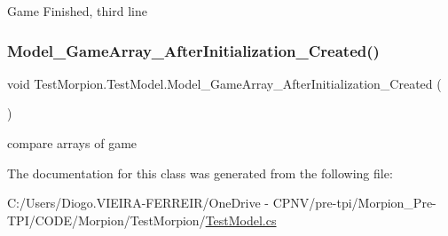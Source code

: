 Game Finished, third line 

\mbox{\label{class_test_morpion_1_1_test_model_a7cbfc6130c15ed728db69ff60b698301}} 
\subsubsection{\texorpdfstring{Model\+\_\+\+Game\+Array\+\_\+\+After\+Initialization\+\_\+\+Created()}{Model\_GameArray\_AfterInitialization\_Created()}}
{\footnotesize\ttfamily void Test\+Morpion.\+Test\+Model.\+Model\+\_\+\+Game\+Array\+\_\+\+After\+Initialization\+\_\+\+Created (\begin{DoxyParamCaption}{ }\end{DoxyParamCaption})}



compare arrays of game 



The documentation for this class was generated from the following file\+:\begin{DoxyCompactItemize}
\item 
C\+:/\+Users/\+Diogo.\+V\+I\+E\+I\+R\+A-\/\+F\+E\+R\+R\+E\+I\+R/\+One\+Drive -\/ C\+P\+N\+V/pre-\/tpi/\+Morpion\+\_\+\+Pre-\/\+T\+P\+I/\+C\+O\+D\+E/\+Morpion/\+Test\+Morpion/\hyperlink{_test_model_8cs}{Test\+Model.\+cs}\end{DoxyCompactItemize}
